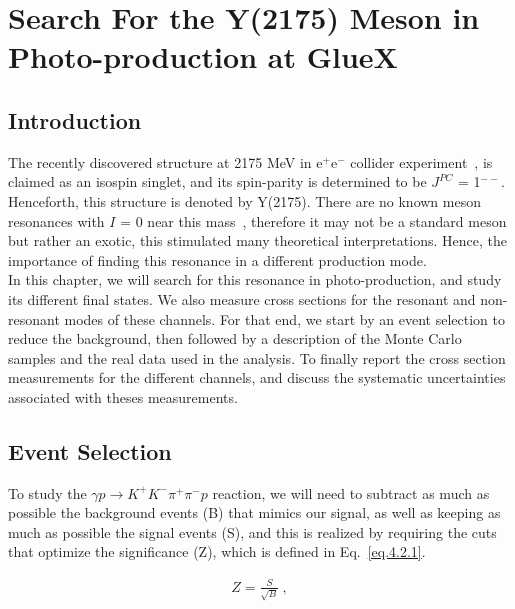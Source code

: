 \chapter{Search For the Y(2175) Meson in Photo-production at GlueX}
\label{p.4}

\section{Introduction}
\label{p.4.1}

The recently discovered structure at 2175 MeV in e$^+$e$^{-}$ collider experiment~\cite{16, 17, 18, 19, 20, 21}, is claimed as an isospin singlet, and its spin-parity is determined to be $J^{PC}$ = 1$^{--}$. Henceforth, this structure is denoted by Y(2175). There are no known meson resonances with $I$ = 0 near this mass~\cite{8}, therefore it may not be a standard meson but rather an exotic, this stimulated many theoretical interpretations. Hence, the importance of finding this resonance in a different production mode.\\
In this chapter, we will search for this resonance in photo-production, and study its different final states. We also measure cross sections for the resonant and non-resonant modes of these channels. For that end, we start by an event selection to reduce the background, then followed by a description of the Monte Carlo samples and the real data used in the analysis. To finally report the cross section measurements for the different channels, and discuss the systematic uncertainties associated with theses measurements.

\section{Event Selection}
\label{p.4.2}

To study the $\gamma p \rightarrow  K^+ K^- \pi^+ \pi^- p$ reaction, we will need to subtract as much as possible the background events (B) that mimics our signal, as well as keeping as much as possible the signal events (S), and this is realized by requiring the cuts that optimize the significance (Z), which is defined in Eq.~\ref{eq.4.2.1}.

\begin{equation}
    \label{eq.4.2.1}
    \begin{aligned}
        Z = \frac{S}{\sqrt{B}}~,
    \end{aligned}
\end{equation}

